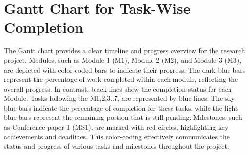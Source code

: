 \begin{table*}[ht]
  \centering
  \renewcommand{\arraystretch}{1.5} 
  \caption{Mapping of Research Milestones to Objectives}
  \label{table:milestones}
\end{table*}


\section{Gantt Chart for Task-Wise Completion}
The Gantt chart provides a clear timeline and progress overview for the research project. Modules, such as Module 1 (M1), Module 2 (M2), and Module 3 (M3), are depicted with color-coded bars to indicate their progress. The dark blue bars represent the percentage of work completed within each module, reflecting the overall progress. In contrast, black lines show the completion status for each Module. Tasks following the M1,2,3..7, are represented by blue lines. The sky blue bars indicate the percentage of completion for these tasks, while the light blue bars represent the remaining portion that is still pending. Milestones, such as Conference paper 1 (MS1), are marked with red circles, highlighting key achievements and deadlines. This color-coding effectively communicates the status and progress of various tasks and milestones throughout the project.

